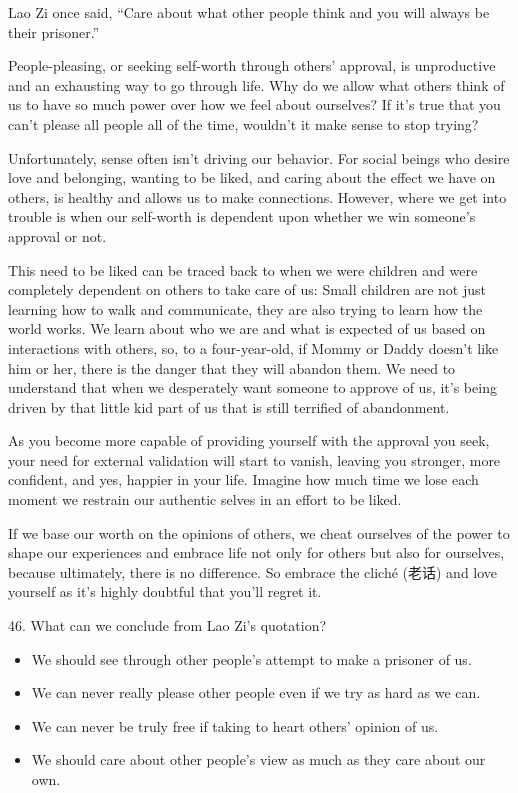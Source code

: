 \documentclass[UTF8,11pt]{ctexart}
\begin{document}
Lao Zi once said, “Care about what other people think and you will always be their prisoner.”


People-pleasing, or seeking self-worth through others’ approval, is unproductive and an exhausting way to go through life. Why do we allow what others think of us to have so much power over how we feel about ourselves? If it’s true that you can’t please all people all of the time, wouldn’t it make sense to stop trying?


Unfortunately, sense often isn’t driving our behavior. For social beings who desire love and belonging, wanting to be liked, and caring about the effect we have on others, is healthy and allows us to make connections. However, where we get into trouble is when our self-worth is dependent upon whether we win someone’s approval or not.


This need to be liked can be traced back to when we were children and were completely dependent on others to take care of us: Small children are not just learning how to walk and communicate, they are also trying to learn how the world works. We learn about who we are and what is expected of us based on interactions with others, so, to a four-year-old, if Mommy or Daddy doesn’t like him or her, there is the danger that they will abandon them. We need to understand that when we desperately want someone to approve of us, it’s being driven by that little kid part of us that is still terrified of abandonment.


As you become more capable of providing yourself with the approval you seek, your need for external validation will start to vanish, leaving you stronger, more confident, and yes, happier in your life. Imagine how much time we lose each moment we restrain our authentic selves in an effort to be liked.


If we base our worth on the opinions of others, we cheat ourselves of the power to shape our experiences and embrace life not only for others but also for ourselves, because ultimately, there is no difference. So embrace the cliché (老话) and love yourself as it’s highly doubtful that you’ll regret it.


46. What can we conclude from Lao Zi’s quotation?


\begin{itemize}[leftmargin=2em,itemsep=.2em,topsep=.4em]\item[A.] We should see through other people’s attempt to make a prisoner of us.
\item[B.] We can never really please other people even if we try as hard as we can.
\item[C.] We can never be truly free if taking to heart others’ opinion of us.
\item[D.] We should care about other people’s view as much as they care about our own.
\end{itemize}
\end{document}
